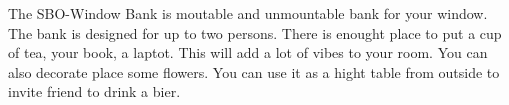 \documentclass{subfiles}
\begin{document}
    The SBO-Window Bank is moutable and unmountable bank for your window.
    The bank is designed for up to two persons. There is enought place to put a cup of tea, your book, a laptot.
    This will add a lot of vibes to your room. You can also decorate place some flowers. 
    You can use it as a hight table from outside to invite friend to drink a bier.
\end{document}
